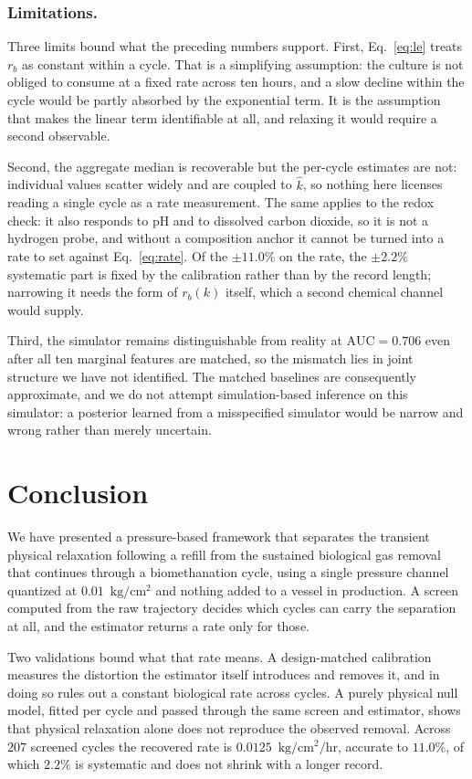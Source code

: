 \documentclass[runningheads]{llncs}
\newcommand{\pu}{\ensuremath{\mathrm{kg/cm^{2}}}}
\newcommand{\ratu}{\ensuremath{\mathrm{kg/cm^{2}/hr}}}
\newcommand{\rb}{\ensuremath{r_{b}}}
\newcommand{\kh}{\ensuremath{\hat{k}}}
\begin{document}
\subsubsection{Limitations.}
Three limits bound what the preceding numbers support. First,
Eq.~\eqref{eq:le} treats \rb{} as constant within a cycle. That is a
simplifying assumption: the culture is not obliged to consume at a
fixed rate across ten hours, and a slow decline within the cycle would
be partly absorbed by the exponential term. It is the assumption that
makes the linear term identifiable at all, and relaxing it would
require a second observable.

Second, the aggregate median is recoverable but the per-cycle estimates
are not: individual values scatter widely and are coupled to \kh{}, so
nothing here licenses reading a single cycle as a rate measurement. The
same applies to the redox check: it also responds to pH and to
dissolved carbon dioxide, so it is not a hydrogen probe, and without a
composition anchor it cannot be turned into a rate to set against
Eq.~\eqref{eq:rate}. Of the $\pm 11.0\%$ on the rate, the $\pm 2.2\%$
systematic part is fixed by the calibration rather than by the record
length; narrowing it needs the form of $\rb(k)$ itself, which a second
chemical channel would supply.

Third, the simulator remains distinguishable from reality at
$\mathrm{AUC}=0.706$ even after all ten marginal features are matched,
so the mismatch lies in joint structure we have not identified. The
matched baselines are consequently approximate, and we do not attempt
simulation-based inference on this simulator: a posterior learned from
a misspecified simulator would be narrow and wrong rather than merely
uncertain.

\section{Conclusion}

We have presented a pressure-based framework that separates the
transient physical relaxation following a refill from the sustained
biological gas removal that continues through a biomethanation cycle,
using a single pressure channel quantized at $0.01$~\pu{} and nothing
added to a vessel in production. A screen computed from the raw
trajectory decides which cycles can carry the separation at all, and
the estimator returns a rate only for those.

Two validations bound what that rate means. A design-matched
calibration measures the distortion the estimator itself introduces and
removes it, and in doing so rules out a constant biological rate across
cycles. A purely physical null model, fitted per cycle and passed
through the same screen and estimator, shows that physical relaxation
alone does not reproduce the observed removal. Across $207$ screened
cycles the recovered rate is $0.0125$~\ratu{}, accurate to $11.0\%$, of
which $2.2\%$ is systematic and does not shrink with a longer record.
\end{document}
